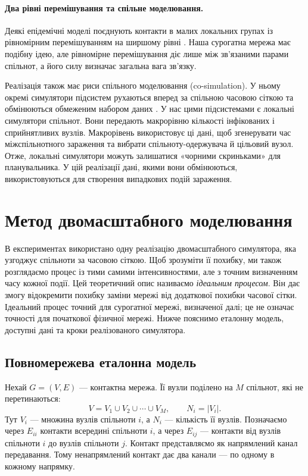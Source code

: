 \paragraph{Два рівні перемішування та спільне моделювання.}
Деякі епідемічні моделі поєднують контакти в малих локальних групах із рівномірним перемішуванням на ширшому рівні \citep{ball1997}. Наша сурогатна мережа має подібну ідею, але рівномірне перемішування діє лише між зв'язаними парами спільнот, а його силу визначає загальна вага зв'язку.

Реалізація також має риси спільного моделювання (co-simulation). У ньому окремі симулятори підсистем рухаються вперед за спільною часовою сіткою та обмінюються обмеженим набором даних \citep{gomes2018cosim}. У нас цими підсистемами є локальні симулятори спільнот. Вони передають макрорівню кількості інфікованих і сприйнятливих вузлів. Макрорівень використовує ці дані, щоб згенерувати час міжспільнотного зараження та вибрати спільноту-одержувача й цільовий вузол. Отже, локальні симулятори можуть залишатися «чорними скриньками» для планувальника. У цій реалізації дані, якими вони обмінюються, використовуються для створення випадкових подій зараження.

\clearpage
\section{Метод двомасштабного моделювання}
\label{sec:method}

В експериментах використано одну реалізацію двомасштабного симулятора, яка узгоджує спільноти за часовою сіткою. Щоб зрозуміти її похибку, ми також розглядаємо процес із тими самими інтенсивностями, але з точним визначенням часу кожної події. Цей теоретичний опис називаємо \emph{ідеальним процесом}. Він дає змогу відокремити похибку заміни мережі від додаткової похибки часової сітки. Ідеальний процес точний для сурогатної мережі, визначеної далі; це не означає точності для початкової фізичної мережі. Нижче пояснимо еталонну модель, доступні дані та кроки реалізованого симулятора.

\subsection{Повномережева еталонна модель}
\label{sec:reference}

Нехай $G=(V,E)$ --- контактна мережа. Її вузли поділено на $M$ спільнот, які не перетинаються:
\begin{equation}
\label{eq:partition}
V=V_1\cup V_2\cup\cdots\cup V_M,
\qquad N_i=|V_i|.
\end{equation}
Тут $V_i$ --- множина вузлів спільноти $i$, а $N_i$ --- кількість її вузлів. Позначаємо через $E_{ii}$ контакти всередині спільноти $i$, а через $E_{ij}$ --- контакти від вузлів спільноти $i$ до вузлів спільноти $j$. Контакт представляємо як напрямлений канал передавання. Тому ненапрямлений контакт дає два канали --- по одному в кожному напрямку.

